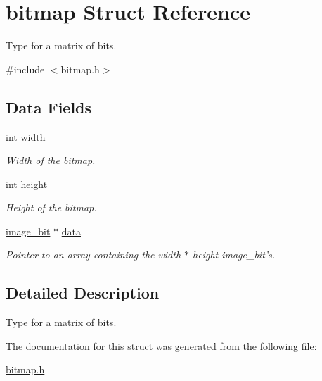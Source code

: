 \hypertarget{structbitmap}{
\section{bitmap Struct Reference}
\label{structbitmap}
}


Type for a matrix of bits.  




{\ttfamily \#include $<$bitmap.h$>$}

\subsection*{Data Fields}
\begin{DoxyCompactItemize}
\item 
\hypertarget{structbitmap_a4ce73692bd5429f0dc54e2b542af9270}{
int \hyperlink{structbitmap_a4ce73692bd5429f0dc54e2b542af9270}{width}}
\label{structbitmap_a4ce73692bd5429f0dc54e2b542af9270}

\begin{DoxyCompactList}\small\item\em Width of the bitmap. \item\end{DoxyCompactList}\item 
\hypertarget{structbitmap_a6e2342e52df0eb9e5048f85515498adf}{
int \hyperlink{structbitmap_a6e2342e52df0eb9e5048f85515498adf}{height}}
\label{structbitmap_a6e2342e52df0eb9e5048f85515498adf}

\begin{DoxyCompactList}\small\item\em Height of the bitmap. \item\end{DoxyCompactList}\item 
\hypertarget{structbitmap_a6cfd9d4b731895e2ebd1d9524dc7c2a7}{
\hyperlink{bitmap_8h_abb0a6c6bdf6faffa9e3773e1d687d67b}{image\_\-bit} $\ast$ \hyperlink{structbitmap_a6cfd9d4b731895e2ebd1d9524dc7c2a7}{data}}
\label{structbitmap_a6cfd9d4b731895e2ebd1d9524dc7c2a7}

\begin{DoxyCompactList}\small\item\em Pointer to an array containing the width $\ast$ height image\_\-bit's. \item\end{DoxyCompactList}\end{DoxyCompactItemize}


\subsection{Detailed Description}
Type for a matrix of bits. 

The documentation for this struct was generated from the following file:\begin{DoxyCompactItemize}
\item 
\hyperlink{bitmap_8h}{bitmap.h}\end{DoxyCompactItemize}
